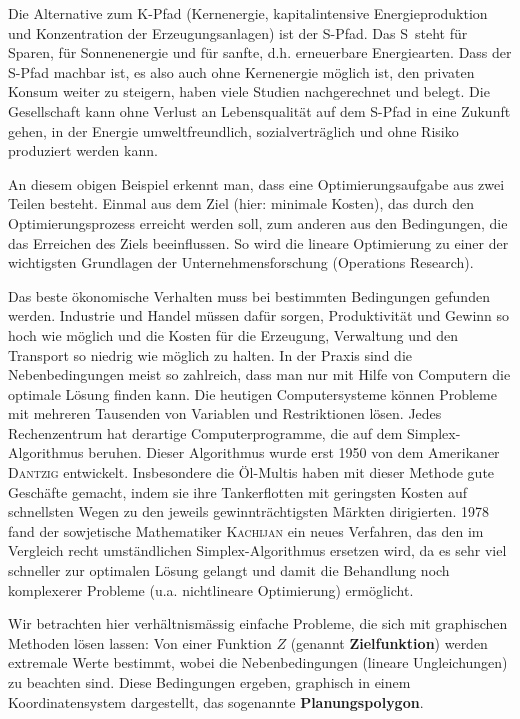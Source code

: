 \documentclass[%
11pt,%
twoside,%
titlepage,%
german,%
headsepline%
]{scrartcl}
\begin{document}
\begin{bem}
Die Alternative zum K-Pfad (Kernenergie, kapitalintensive Energieproduktion und Konzentration der Erzeugungsanlagen) ist der S-Pfad. Das \glqq S\grqq\ steht f\"ur Sparen, f\"ur Sonnenenergie und f\"ur sanfte, d.h. erneuerbare Energiearten. Dass der S-Pfad machbar ist, es also auch ohne Kernenergie m\"oglich ist, den privaten Konsum weiter zu steigern, haben viele Studien nachgerechnet und belegt. Die Gesellschaft kann ohne Verlust an Lebensqualit\"at auf dem S-Pfad in eine Zukunft gehen, in der Energie umweltfreundlich, sozialvertr\"aglich und ohne Risiko produziert werden kann.
\end{bem}

An diesem obigen Beispiel erkennt man, dass eine Optimierungsaufgabe aus zwei Teilen besteht. Einmal aus dem Ziel (hier: minimale Kosten), das durch den Optimierungsprozess erreicht werden soll, zum anderen aus den Bedingungen, die das Erreichen des Ziels beeinflussen. So wird die lineare Optimierung zu einer der wichtigsten Grundlagen der Unternehmensforschung (Operations Research).

Das beste \"okonomische Verhalten muss bei bestimmten Bedingungen gefunden werden. Industrie und Handel m\"ussen daf\"ur sorgen, Produktivit\"at und Gewinn so hoch wie m\"oglich und die Kosten f\"ur die Erzeugung, Verwaltung und den Transport so niedrig wie m\"oglich zu halten. In der Praxis sind die Nebenbedingungen meist so zahlreich, dass man nur mit Hilfe von Computern die optimale L\"osung finden kann. Die heutigen Computersysteme k\"onnen Probleme mit mehreren Tausenden von Variablen und Restriktionen l\"osen. Jedes Rechenzentrum hat derartige Computerprogramme, die auf dem Simplex-Algorithmus beruhen. Dieser Algorithmus wurde erst 1950 von dem Amerikaner \textsc{Dantzig} entwickelt. Insbesondere die \"Ol-Multis haben mit dieser Methode gute Gesch\"afte gemacht, indem sie ihre Tankerflotten mit geringsten Kosten auf schnellsten Wegen zu den jeweils gewinntr\"achtigsten M\"arkten dirigierten. 1978 fand der sowjetische Mathematiker \textsc{Kachijan} ein neues Verfahren, das den im Vergleich recht umst\"andlichen Simplex-Algorithmus ersetzen wird, da es sehr viel schneller zur optimalen L\"osung gelangt und damit die Behandlung noch komplexerer Probleme (u.a. nichtlineare Optimierung) erm\"oglicht.

Wir betrachten hier verh\"altnism\"assig einfache Probleme, die sich mit graphischen Methoden l\"osen lassen: Von einer Funktion $Z$ (genannt \textbf{Ziel\-funk\-tion}) werden extremale Werte bestimmt, wobei die Nebenbedingungen (lineare Ungleichungen) zu beachten sind. Diese Bedingungen ergeben, graphisch in einem Koordinatensystem dargestellt, das sogenannte \textbf{Planungspolygon}.
\end{document}
